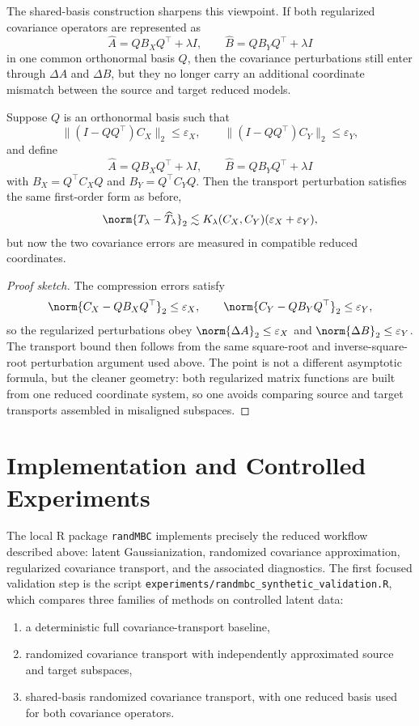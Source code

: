 The shared-basis construction sharpens this viewpoint. If both regularized covariance operators are represented as
\[
	\widehat A = Q B_X Q^\top + \lambda I,
	\qquad
	\widehat B = Q B_Y Q^\top + \lambda I
\]
in one common orthonormal basis $Q$, then the covariance perturbations still enter through $\Delta A$ and $\Delta B$, but they no longer carry an additional coordinate mismatch between the source and target reduced models.

\begin{proposition}
	Suppose $Q$ is an orthonormal basis such that
	\[
		\|(I-QQ^\top)C_X\|_2 \le \varepsilon_X,
		\qquad
		\|(I-QQ^\top)C_Y\|_2 \le \varepsilon_Y,
	\]
	and define
	\[
		\widehat A = Q B_X Q^\top + \lambda I,
		\qquad
		\widehat B = Q B_Y Q^\top + \lambda I
	\]
	with $B_X = Q^\top C_X Q$ and $B_Y = Q^\top C_Y Q$. Then the transport perturbation satisfies the same first-order form as before,
	\[
		\norm{T_\lambda - \widehat T_\lambda}_2
		\lesssim
		K_\lambda(C_X,C_Y)(\varepsilon_X + \varepsilon_Y),
	\]
	but now the two covariance errors are measured in compatible reduced coordinates.
\end{proposition}

\begin{proof}[Proof sketch]
	The compression errors satisfy
	\[
		\norm{C_X - Q B_X Q^\top}_2 \le \varepsilon_X,
		\qquad
		\norm{C_Y - Q B_Y Q^\top}_2 \le \varepsilon_Y,
	\]
	so the regularized perturbations obey $\norm{\Delta A}_2 \le \varepsilon_X$ and $\norm{\Delta B}_2 \le \varepsilon_Y$. The transport bound then follows from the same square-root and inverse-square-root perturbation argument used above. The point is not a different asymptotic formula, but the cleaner geometry: both regularized matrix functions are built from one reduced coordinate system, so one avoids comparing source and target transports assembled in misaligned subspaces.
\end{proof}

\section{Implementation and Controlled Experiments}

The local R package \texttt{randMBC} implements precisely the reduced workflow described above: latent Gaussianization, randomized covariance approximation, regularized covariance transport, and the associated diagnostics. The first focused validation step is the script \texttt{experiments/randmbc\_synthetic\_validation.R}, which compares three families of methods on controlled latent data:
\begin{enumerate}
	\item a deterministic full covariance-transport baseline,
	\item randomized covariance transport with independently approximated source and target subspaces,
	\item shared-basis randomized covariance transport, with one reduced basis used for both covariance operators.
\end{enumerate}

